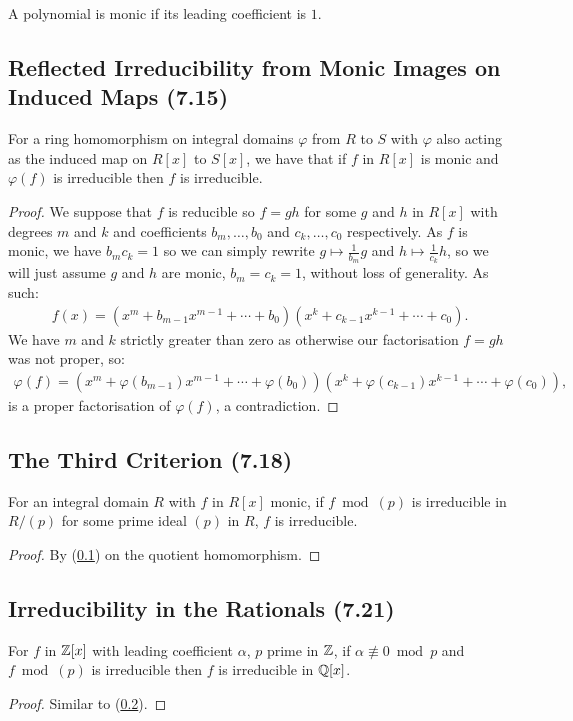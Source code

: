 A polynomial is monic if its leading coefficient is $1$.

\subsection{Reflected Irreducibility from Monic Images on Induced Maps (7.15)} \label{7.15}

For a ring homomorphism on integral domains $\varphi$ from $R$ to $S$ with $\varphi$ also
acting as the induced map on $R[x]$ to $S[x]$, we have that if $f$ in $R[x]$ is monic
and $\varphi(f)$ is irreducible then $f$ is irreducible.

\begin{proof}
    We suppose that $f$ is reducible so $f = gh$ for some $g$ and $h$ in $R[x]$ with
    degrees $m$ and $k$ and coefficients $b_m, \ldots, b_0$ and $c_k, \ldots, c_0$
    respectively. As $f$ is monic, we have $b_mc_k = 1$ so we can simply rewrite
    $g \mapsto \frac{1}{b_m}g$ and $h \mapsto \frac{1}{c_k}h$, so we will just assume
    $g$ and $h$ are monic, $b_m = c_k = 1$, without loss of generality. As such:
    \begin{align*}
        f(x) = (x^m + b_{m - 1}x^{m - 1} + \cdots + b_0)
            (x^k + c_{k - 1}x^{k - 1} + \cdots + c_0).
    \end{align*} We have $m$ and $k$ strictly greater than zero as otherwise our
    factorisation $f = gh$ was not proper, so: \begin{align*}
        \varphi(f) = (x^m + \varphi(b_{m - 1})x^{m - 1} + \cdots + \varphi(b_0))
            (x^k + \varphi(c_{k - 1})x^{k - 1} + \cdots + \varphi(c_0)),
    \end{align*} is a proper factorisation of $\varphi(f)$, a contradiction.
\end{proof}

\subsection{The Third Criterion (7.18)} \label{7.18}

For an integral domain $R$ with $f$ in $R[x]$ monic, if $f \bmod (p)$
is irreducible in $R / (p)$ for some prime ideal $(p)$ in $R$, $f$ is irreducible.

\begin{proof}
    By (\ref{7.15}) on the quotient homomorphism.
\end{proof}

\subsection{Irreducibility in the Rationals (7.21)} \label{7.21}

For $f$ in $\mathbb{Z}[x]$ with leading coefficient $\alpha$, 
$p$ prime in $\mathbb{Z}$, if $\alpha \not\equiv 0 \bmod p$ and
$f \bmod (p)$ is irreducible then $f$ is irreducible in $\mathbb{Q}[x]$. 

\begin{proof}
    Similar to (\ref{7.18}).
\end{proof}
